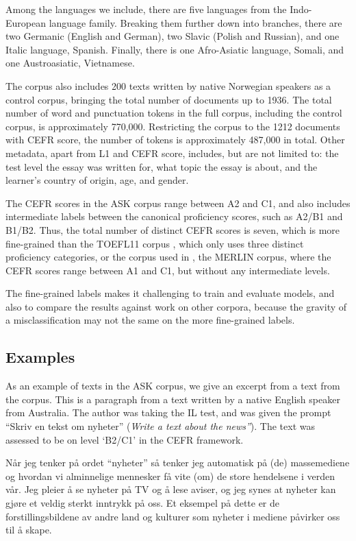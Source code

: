 Among the languages we include, there are five languages from the
Indo-European language family. Breaking them further down into branches,
there are two Germanic (English and German), two Slavic (Polish and Russian),
and one Italic language, Spanish. Finally, there is one Afro-Asiatic
language, Somali, and one Austroasiatic, Vietnamese.

The corpus also includes 200 texts written by native Norwegian speakers as a
control corpus, bringing the total number of documents up to 1936. The total
number of word and punctuation tokens in the full corpus, including the
control corpus, is approximately 770,000. Restricting the corpus to the 1212
documents with \ac{CEFR} score, the number of tokens is approximately 487,000
in total. Other metadata, apart from L1 and CEFR score, includes, but are not
limited to: the test level the essay was written for, what topic the essay
is about, and the learner's country of origin, age, and gender.

The CEFR scores in the ASK corpus range between A2 and C1, and also includes
intermediate labels between the canonical proficiency scores, such as A2/B1
and B1/B2. Thus, the total number of distinct CEFR scores is seven, which is
more fine-grained than the TOEFL11 corpus \autocite{blanchard13}, which only
uses three distinct proficiency categories, or the corpus used in
\textcite{vajjala18universalCEFR}, the MERLIN corpus, where the CEFR scores
range between A1 and C1, but without any intermediate levels.

The fine-grained labels makes it challenging to train and evaluate models,
and also to compare the results against work on other corpora, because the
gravity of a misclassification may not the same on the more fine-grained
labels.


\subsection{Examples}

As an example of texts in the ASK corpus, we give an excerpt from a text from
the corpus. This is a paragraph from a text written by a native English
speaker from Australia. The author was taking the IL test, and was given the
prompt ``Skriv en tekst om nyheter'' (\emph{Write a text about the news''}).
The text was assessed to be on level `B2/C1' in the CEFR framework.

\begin{displayquote}  %
  Når jeg tenker på ordet ``nyheter'' så tenker jeg automatisk på (de)
  massemediene og hvordan vi alminnelige mennesker få vite (om) de store
  hendelsene i verden vår. Jeg pleier å se nyheter på TV og å lese aviser, og
  jeg synes at nyheter kan gjøre et veldig sterkt inntrykk på oss. Et
  eksempel på dette er de forstillingsbildene av andre land og kulturer som
  nyheter i mediene påvirker oss til å skape.
\end{displayquote}


